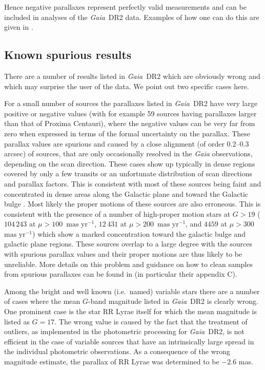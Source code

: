 \documentclass[longauth]{aa_gaia} %
\newcommand\gaia{\textit{Gaia}}
\newcommand\gdr[1]{\gaia~DR#1}
\newcommand\masyr{\ensuremath{\text{mas~yr}^{-1}}}
\begin{document}
Hence negative parallaxes represent perfectly valid measurements and can be included in analyses of
the \gdr{2} data. Examples of how one can do this are given in \cite{DR2-DPACP-38}.

\subsection{Known spurious results}

There are a number of results listed in \gdr{2} which are obviously wrong and which may surprise
the user of the data. We point out two specific cases here.

For a small number of sources the parallaxes listed in \gdr{2} have very large positive or
negative values (with for example 59 sources having parallaxes larger than that of Proxima
Centauri), where the negative values can be very far from zero when expressed in terms of the formal
uncertainty on the parallax. These parallax values are spurious and caused by a close alignment (of
order $0.2$--$0.3$ arcsec) of sources, that are only occasionally resolved in the {\gaia}
observations, depending on the scan direction. These cases show up typically in dense regions
covered by only a few transits or an unfortunate distribution of scan directions and parallax
factors. This is consistent with most of these sources being faint and concentrated in dense areas
along the Galactic plane and toward the Galactic bulge \citep[see figure C4 in][]{DR2-DPACP-51}. Most
likely the proper motions of these sources are also erroneous. This is consistent with the presence
of a number of high-proper motion stars at $G>19$ ($104\,243$ at $\mu>100$~\masyr, $12\,431$ at
$\mu>200$~\masyr, and $4459$ at $\mu>300$~\masyr) which show a marked concentration toward the
galactic bulge and galactic plane regions. These sources overlap to a large degree with the sources
with spurious parallax values and their proper motions are thus likely to be unreliable. More
details on this problem and guidance on how to clean samples from spurious parallaxes can be found
in \cite{DR2-DPACP-51} (in particular their appendix C).

Among the bright and well known (i.e.\ named) variable stars there are a number of cases where the
mean $G$-band magnitude listed in \gdr{2} is clearly wrong. One prominent case is the star RR
Lyrae itself for which the mean magnitude is listed as $G=17$. The wrong value is caused by the fact
that the treatment of outliers, as implemented in the photometric processing for \gdr{2}, is not
efficient in the case of variable sources that have an intrinsically large spread in the individual
photometric observations. As a consequence of the wrong magnitude estimate, the parallax of RR Lyrae
was determined to be $-2.6$ mas.
\end{document}
